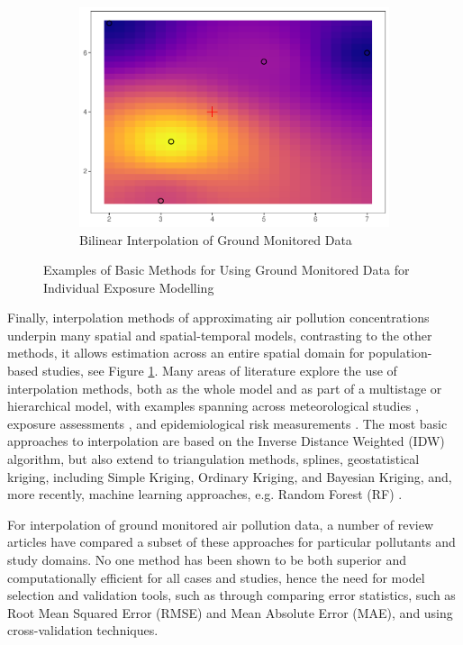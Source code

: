 \begin{figure}
\begin{subfigure}{.33\textwidth}
        \includegraphics[width=\linewidth]{Images/interpol.pdf}
        \caption{Bilinear Interpolation of Ground Monitored Data}
        \label{fig:interpol}
    \end{subfigure}
\caption{Examples of Basic Methods for Using Ground Monitored Data for Individual Exposure Modelling}
\label{fig:monitormethods}
\end{figure}

Finally, interpolation methods of approximating air pollution concentrations underpin many spatial and spatial-temporal models, contrasting to the other methods, it allows estimation across an entire spatial domain for population-based studies, see Figure \ref{fig:interpol}. Many areas of literature explore the use of interpolation methods, both as the whole model and as part of a multistage or hierarchical model, with examples spanning across meteorological studies \citep{Haberlandt2007GeostatisticalEvent, Li2005SpatialPlateau}, exposure assessments \citep{Carnevale2021OptimalForecast}, and epidemiological risk measurements \citep{Congdon2013SpatiallyRisk, Blanco2018GeographicalTechnique}. The most basic approaches to interpolation are based on the Inverse Distance Weighted (IDW) algorithm, but also extend to triangulation methods, splines, geostatistical kriging, including Simple Kriging, Ordinary Kriging, and Bayesian Kriging, and, more recently, machine learning approaches, e.g. Random Forest (RF) \citep{Susanto2016SpatiotemporalModelling}. 

For interpolation of ground monitored air pollution data, a number of review articles have compared a subset of these approaches for particular pollutants and study domains. No one method has been shown to be both superior and computationally efficient for all cases and studies, hence the need for model selection and validation tools, such as through comparing error statistics, such as Root Mean Squared Error (RMSE) and Mean Absolute Error (MAE), and using cross-validation techniques.  

